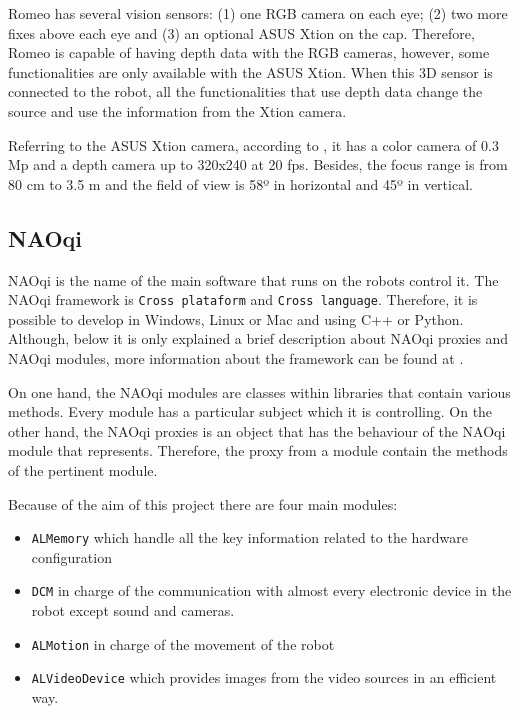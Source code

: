 \documentclass[12pt,a4paper,final,twoside,openright]{report}
\begin{document}
Romeo has several vision sensors: (1) one RGB camera on each eye; (2) two more fixes above each eye and (3) an optional ASUS Xtion on the cap. Therefore, Romeo is capable of having depth data with the RGB cameras, however, some functionalities are only available with the ASUS Xtion. When this 3D sensor is connected to the robot, all the functionalities that use depth data change the source and use the information from the Xtion camera. 

Referring to the ASUS Xtion camera, according to \cite{Aldebaran}, it has a color camera of 0.3 Mp and a depth camera up to 320x240 at 20 fps. Besides, the focus range is from 80 cm to 3.5 m and the field of view is 58º in horizontal and 45º in vertical.

\subsection{NAOqi}
\label{sec:naoqi}

NAOqi is the name of the main software that runs on the robots control it. The NAOqi framework is \texttt{Cross plataform} and \texttt{Cross language}. Therefore, it is possible to develop in Windows, Linux or Mac and using C++ or Python. Although, below it is only explained a brief description about NAOqi proxies and NAOqi modules, more information about the framework can be found at \cite{Aldebaran}. 

On one hand, the NAOqi modules are classes within libraries that contain various methods. Every module has a particular subject which it is controlling. On the other hand, the NAOqi proxies is an object that has the behaviour of the NAOqi module that represents. Therefore, the proxy from a module contain the methods of the pertinent module.

Because of the aim of this project there are four main modules:

\begin{itemize}
\item \texttt{ALMemory} which handle all the key information related to the hardware configuration
\item \texttt{DCM} in charge of the communication with almost every electronic device in the robot except sound and cameras.
\item \texttt{ALMotion} in charge of the movement of the robot
\item \texttt{ALVideoDevice} which provides images from the video sources in an efficient way.
\end{itemize} 
\end{document}
